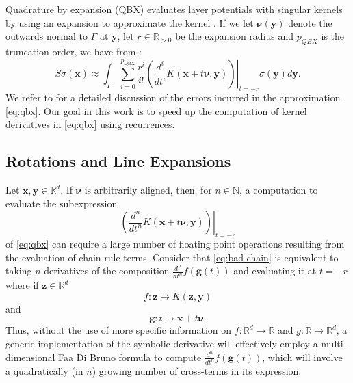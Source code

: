 \documentclass[12pt]{article}
\def\N{{\mathbb N}}
\def\R{{\mathbb R}}
\let\b=\boldsymbol
\theoremstyle{definition}
\theoremstyle{plain}
\theoremstyle{definition}
\begin{document}
Quadrature by expansion (QBX) evaluates layer potentials with singular kernels by using an expansion to approximate the kernel \cite{klockner2013quadrature}. If we let $\b{\nu}(\b{y})$ denote the outwards normal to $\Gamma$ at $\b{y}$, let $r \in \R_{>0}$ be the expansion radius and $p_{QBX}$ is the truncation order, we have from \cite{epstein2013convergence}:
\begin{equation}
\label{eq:qbx}
S\sigma(\b{x}) \approx  \int_{\Gamma} \sum_{i=0}^{p_{\text{QBX}}} \frac{r^i}{i!}\left. \left( \frac{d^i}{dt^i} K(\b{x} + t\b{\nu}, \b{y})  \right)\right|_{t=-r} \sigma(\b{y}) d\b{y}.
\end{equation}
We refer to \cite{epstein2013convergence} for a detailed discussion of the errors incurred in the approximation \eqref{eq:qbx}. Our goal in this work is to speed up the computation of kernel derivatives in \eqref{eq:qbx} using recurrences.

\subsection{Rotations and Line Expansions}
\label{sec:rot}
Let $\b{x},\b{y} \in \R^d$. If $\b{\nu}$ is arbitrarily aligned, then, for $n \in \N$, a computation to evaluate the subexpression
\begin{equation}
\label{eq:bad-chain}
\left. \left( \frac{d^n}{dt^n} K(\b{x} + t\b{\nu}, \b{y})  \right)\right|_{t=-r}
\end{equation}
of \eqref{eq:qbx} can require a large number of floating point operations resulting from the evaluation of chain rule terms. Consider that \eqref{eq:bad-chain} is equivalent to taking $n$ derivatives of the composition $\frac{d^n}{dt^n}  f(\b{g}(t))$ and evaluating it at $t = -r$ where if $\b{z} \in \R^d$
\[
f : \b{z} \mapsto K(\b{z},\b{y})
\]
and
\[
\b{g}: t \mapsto\b{x} + t\b{\nu}.
\]
Thus, without the use of more specific information
on $f: \R^d \to \R$ and $g: \R \to \R^d$, a generic implementation of the symbolic derivative will effectively employ a multi-dimensional Faa Di Bruno formula to compute $\frac{d^n}{dt^n} f(\b{g}(t))$, which will involve a quadratically (in $n$) growing number of cross-terms in its expression.
\end{document}

